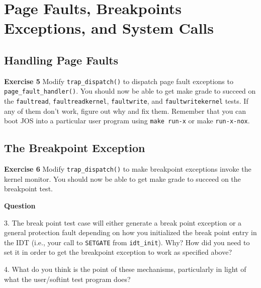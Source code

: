 \documentclass[11pt]{article}
\begin{document}
\section{Page Faults, Breakpoints Exceptions, and System Calls}
\subsection{Handling Page Faults}
\begin{framed}
\noindent\textbf{Exercise 5} Modify \lstinline|trap_dispatch()| to dispatch page fault exceptions to \lstinline|page_fault_handler()|. You should now be able to get make grade to succeed on the \lstinline|faultread|, \lstinline|faultreadkernel|, \lstinline|faultwrite|, and \lstinline|faultwritekernel| tests. If any of them don't work, figure out why and fix them. Remember that you can boot JOS into a particular user program using \lstinline|make run-x| or make \lstinline|run-x-nox|.
\end{framed}

\subsection{The Breakpoint Exception}
\begin{framed}
\noindent\textbf{Exercise 6} Modify \lstinline|trap_dispatch()| to make breakpoint exceptions invoke the kernel monitor. You should now be able to get make grade to succeed on the breakpoint test. 
\end{framed}

\begin{framed}
\noindent\textbf{Question}

3. The break point test case will either generate a break point exception or a general protection fault depending on how you initialized the break point entry in the IDT (i.e., your call to \lstinline|SETGATE| from \lstinline|idt_init|). Why? How did you need to set it in order to get the breakpoint exception to work as specified above?

4. What do you think is the point of these mechanisms, particularly in light of what the user/softint test program does?
\end{framed}
\end{document}
